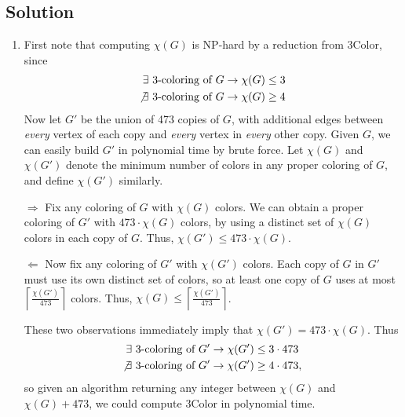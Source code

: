 \documentclass[14pt]{extreport}
\begin{document}
\subsection*{Solution}
    \begin{enumerate}
        \item First note that computing $\chi(G)$ is \textsf{NP-hard} by a reduction from \textsf{3Color}, since
        \begin{align*}
            \exists \ \text{3-coloring of $G$} &\rightarrow \chi(G) \le 3 \\
            \not\exists \ \text{3-coloring of $G$} &\rightarrow \chi(G) \ge 4
        \end{align*}
        Now let \( G' \) be the union of 473 copies of \( G \), with additional edges between \textit{every} vertex of each copy and \textit{every} vertex in \textit{every} other copy. Given \( G \), we can easily build \( G' \) in polynomial time by brute force. Let \( \chi(G) \) and \( \chi(G') \) denote the minimum number of colors in any proper coloring of \( G \), and define \( \chi(G') \) similarly.

        \vspace{3mm}
        \(\Longrightarrow\) Fix any coloring of \( G \) with \( \chi(G) \) colors. We can obtain a proper coloring of \( G' \) with \( 473 \cdot \chi(G) \) colors, by using a distinct set of \( \chi(G) \) colors in each copy of \( G \). Thus, \( \chi(G') \leq 473 \cdot \chi(G) \).

        \vspace{3mm}
        \(\Longleftarrow\) Now fix any coloring of \( G' \) with \( \chi(G') \) colors. Each copy of \( G \) in \( G' \) must use its own distinct set of colors, so at least one copy of \( G \) uses at most \( \left\lceil \frac{\chi(G')}{473} \right\rceil \) colors. Thus, \( \chi(G) \leq \left\lceil \frac{\chi(G')}{473} \right\rceil \).

        \vspace{3mm}
        These two observations immediately imply that \( \chi(G') = 473 \cdot \chi(G) \). Thus
        \begin{align*}
            \exists \ \text{3-coloring of $G'$} &\rightarrow \chi(G') \le 3 \cdot 473 \\
            \not\exists \ \text{3-coloring of $G'$} &\rightarrow \chi(G') \ge 4 \cdot 473,
        \end{align*}
        so given an algorithm returning any integer between $\chi(G)$ and $\chi(G) + 473$, we could compute \textsf{3Color} in polynomial time.


\end{enumerate}
\end{document}

